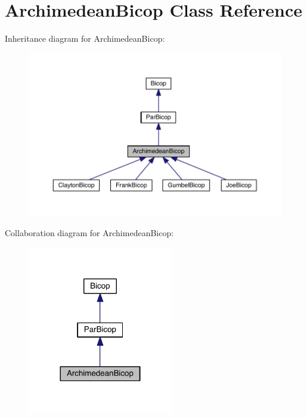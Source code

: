 \hypertarget{class_archimedean_bicop}{}\section{Archimedean\+Bicop Class Reference}
\label{class_archimedean_bicop}


Inheritance diagram for Archimedean\+Bicop\+:
\nopagebreak
\begin{figure}[H]
\begin{center}
\leavevmode
\includegraphics[width=350pt]{class_archimedean_bicop__inherit__graph}
\end{center}
\end{figure}


Collaboration diagram for Archimedean\+Bicop\+:
\nopagebreak
\begin{figure}[H]
\begin{center}
\leavevmode
\includegraphics[width=180pt]{class_archimedean_bicop__coll__graph}
\end{center}
\end{figure}
